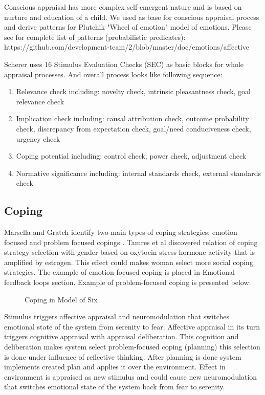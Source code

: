Conscious appraisal has more complex self-emergent nature and is based on nurture and education of a child. We used \cite{appraisal_considered_as_a_process} as base for conscious appraisal process and derive patterns for Plutchik "Wheel of emotion" model of emotions. Please see for complete list of patterns (probabilistic predicates): https://github.com/development-team/2/blob/master/doc/emotions/affective%

Scherer uses 16 Stimulus Evaluation Checks (SEC) as basic blocks for whole appraisal processes. And overall process looks like following sequence:

\begin{enumerate}
 \item  Relevance check including: novelty check, intrinsic pleasantness check, goal relevance check
 \item  Implication check including: causal attribution check, outcome probability check, discrepancy from expectation check, goal/need conduciveness check, urgency check
 \item  Coping potential including: control check, power check, adjustment check
 \item  Normative significance including: internal standards check, external standards check
\end{enumerate}

\subsection{Coping}

Marsella and Gratch identify two main types of coping strategies: emotion-focused and problem focused copings \cite{dont_worry_be_happy}. Tamres et al discovered relation of coping strategy selection with gender \cite{sex_differencies} based on oxytocin stress hormone activity that is amplified by estrogen. This effect could makes woman select more social coping strategies.
The example of emotion-focused coping is placed in Emotional feedback loops section.
Example of problem-focused coping is presented below:

\begin{figure}
\vspace{2.5cm}
\caption{Coping in Model of Six}
\end{figure}

Stimulus triggers affective appraisal and neuromodulation that switches emotional state of the system from serenity to fear. Affective appraisal in its turn triggers cognitive appraisal with appraisal deliberation. This cognition and deliberation makes system select problem-focused coping (planning) this selection is done under influence of reflective thinking. After planning is done system implements created plan and applies it over the environment. Effect in environment is appraised as new stimulus and could cause new neuromodulation that switches emotional state of the system back from fear to serenity.

